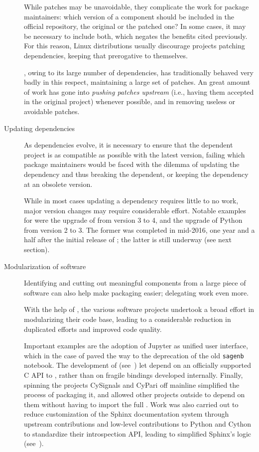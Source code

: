 \documentclass{deliverablereport}
\begin{document}
\begin{description}
  While patches may be unavoidable, they complicate the work for
  package maintainers: which version of a component should be included
  in the official repository, the original or the patched one? %
  In some cases, it may be necessary to include both, which negates
  the benefits cited previously. %
  For this reason, Linux distributions usually discourage projects
  patching dependencies, keeping that prerogative to themselves. %

  \Sage, owing to its large number of dependencies, has traditionally
  behaved very badly in this respect, maintaining a large set of
  patches. %
  An great amount of work has gone into \emph{pushing patches
    upstream} (i.e., having them accepted in the original project)
  whenever possible, and in removing useless or avoidable patches.
  
\item[Updating dependencies] As dependencies evolve, it is necessary
  to ensure that the dependent project is as compatible as possible
  with the latest version,
  failing which package maintainers would be faced with the dilemma
  of updating the dependency and thus breaking the dependent, or
  keeping the dependency at an obsolete version.

  While in most cases updating a dependency requires little to no
  work, major version changes may require considerable effort. %
  Notable examples for \Sage were the upgrade of \Singular from
  version 3 to 4, and the upgrade of Python from version 2 to 3. %
  The former was completed in mid-2016, one year and a half after the
  initial release of ; the latter is still underway (see
  next section).
  
\item[Modularization of \ODK software] Identifying and cutting out
  meaningful components from a large piece of software can also help
  make packaging easier; delegating work even more.

  With the help of \ODK, the various software projects undertook a
  broad effort in modularizing their code base, leading to a
  considerable reduction in duplicated efforts and improved code
  quality. %

  Important examples are the adoption of Jupyter as unified user
  interface, which in the case of \Sage paved the way to the
  deprecation of the old \texttt{sagenb} notebook. %
  The development of \libGAP (see~) let
  \Sage depend on an officially supported C API to \GAP, rather than
  on fragile bindings developed internally. %
  Finally, spinning the projects CySignals and CyPari off mainline
  \Sage simplified the process of packaging it, and allowed other
  projects outside \ODK to depend on them without having to import the
  full \Sage. Work was also carried out to reduce customization
  of the Sphinx documentation system through upstream contributions
  and low-level contributions to Python and Cython to standardize
  their introspection API, leading to simplified Sphinx's logic
  (see~).


\end{description}
\end{document}
